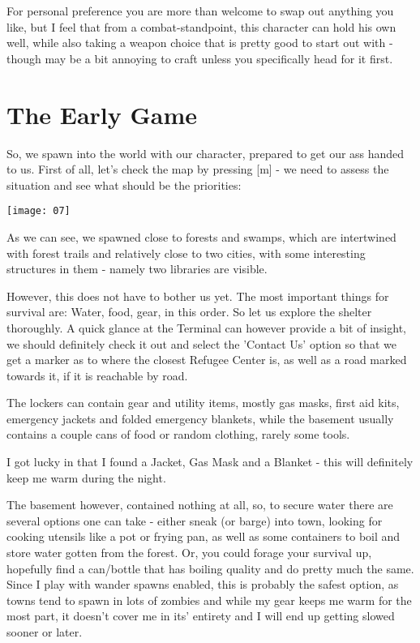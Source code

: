 For personal preference you are more than welcome to swap out anything you like, but I feel that from a combat-standpoint, this character can hold his own well, while also taking a weapon choice that is pretty good to start out with - though may be a bit annoying to craft unless you specifically head for it first.

\section{The Early Game}

So, we spawn into the world with our character, prepared to get our ass handed to us. First of all, let's check the map by pressing [m] - we need to assess the situation and see what should be the priorities:

\texttt{[image: 07]}

As we can see, we spawned close to forests and swamps, which are intertwined with forest trails and relatively close to two cities, with some interesting structures in them - namely two libraries are visible.

However, this does not have to bother us yet. The most important things for survival are:
Water,
food,
gear,
in this order. So let us explore the shelter thoroughly.
A quick glance at the Terminal can however provide a bit of insight, we should definitely check it out and select the 'Contact Us' option so that we get a marker as to where the closest Refugee Center is, as well as a road marked towards it, if it is reachable by road.

The lockers can contain gear and utility items, mostly gas masks, first aid kits, emergency jackets and folded emergency blankets, while the basement usually contains a couple cans of food or random clothing, rarely some tools.

I got lucky in that I found a Jacket, Gas Mask and a Blanket - this will definitely keep me warm during the night.

The basement however, contained nothing at all, so, to secure water there are several options one can take - either sneak (or barge) into town, looking for cooking utensils like a pot or frying pan, as well as some containers to boil and store water gotten from the forest. Or, you could forage your survival up, hopefully find a can/bottle that has boiling quality and do pretty much the same. Since I play with wander spawns enabled, this is probably the safest option, as towns tend to spawn in lots of zombies and while my gear keeps me warm for the most part, it doesn't cover me in its' entirety and I will end up getting slowed sooner or later.


